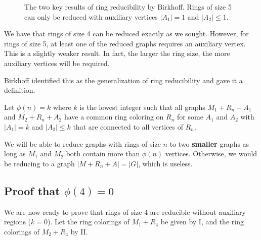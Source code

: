 \begin{figure}[!ht]
    \centering
    \caption{The two key results of ring reducibility by Birkhoff. Rings of size 5 can only be reduced with auxiliary vertices $|A_1|=1$ and $|A_2| \leq 1$.}
\end{figure}

We have that rings of size 4 can be reduced exactly as we sought. However, for rings of size 5, at least one of the reduced graphs requires an auxiliary vertex. This is a slightly weaker result. In fact, the larger the ring size, the more auxiliary vertices will be required.

Birkhoff identified this as the generalization of ring reducibility and gave it a definition. 

\begin{definition}
    Let $\phi(n) = k$ where $k$ is the lowest integer such that all graphs $M_1+R_n+A_1$ and $M_2+R_n+A_2$ have a common ring coloring on $R_n$ for some $A_1$ and $A_2$ with $|A_1|=k$ and $|A_2|\leq k$ that are connected to all vertices of $R_n$.
\end{definition} 

We will be able to reduce graphs with rings of size $n$ to two \textbf{smaller}  graphs as long as $M_1$ and $M_2$ both contain more than $\phi(n)$ vertices. Otherwise, we would be reducing to a graph $|M+R_n+A| = |G|$, which is useless.

\subsection{Proof that $\phi(4)=0$}

We are now ready to prove that rings of size 4 are reducible without auxiliary regions ($k=0$). Let the ring colorings of $M_1+R_4$ be given by I, and the ring colorings of $M_2+R_4$ by II. 


